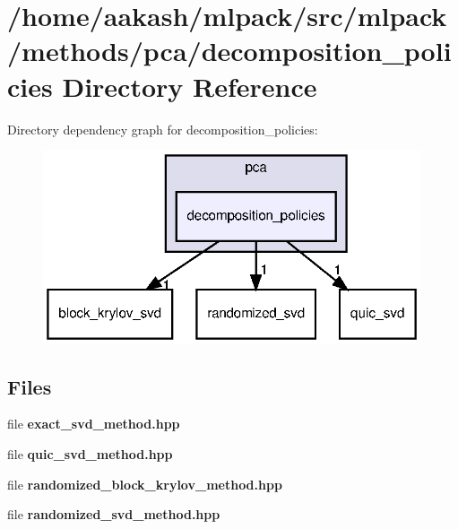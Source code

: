 \section{/home/aakash/mlpack/src/mlpack/methods/pca/decomposition\+\_\+policies Directory Reference}
\label{dir_eaf3eb2f8fbf029de397988dd3888058}
Directory dependency graph for decomposition\+\_\+policies\+:
\nopagebreak
\begin{figure}[H]
\begin{center}
\leavevmode
\includegraphics[width=316pt]{dir_eaf3eb2f8fbf029de397988dd3888058_dep}
\end{center}
\end{figure}
\subsection*{Files}
\begin{DoxyCompactItemize}
\item 
file \textbf{ exact\+\_\+svd\+\_\+method.\+hpp}
\item 
file \textbf{ quic\+\_\+svd\+\_\+method.\+hpp}
\item 
file \textbf{ randomized\+\_\+block\+\_\+krylov\+\_\+method.\+hpp}
\item 
file \textbf{ randomized\+\_\+svd\+\_\+method.\+hpp}
\end{DoxyCompactItemize}
